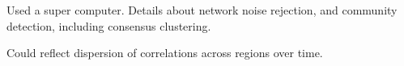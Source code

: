 \documentclass[a4paper,12pt]{article}
\theoremstyle{definition}
\begin{document}
Used a super computer. Details about network noise rejection, and community detection, including consensus clustering.

Could reflect dispersion of correlations across regions over time.


\end{document}
